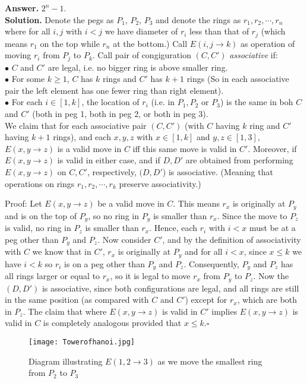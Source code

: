 \documentclass[11pt]{article}
\begin{document}
\begin{enumerate}
\textbf {Answer.} $2^n-1$.\\
\textbf{Solution.} Denote the pegs as $P_1$, $P_2$, $P_3$ and denote the rings as $r_1, r_2, \cdots ,r_n$ where for all $i, j$ with $i<j$ we have diameter of $r_i$ less than that of $r_j$ (which means $r_1$ on the top while $r_n$ at the bottom.) Call $E(i, j\to k)$ as operation of moving $r_i$ from $P_j$ to $P_k$. Call pair of congiguration $(C, C')$ \emph{associative} if:\\
$\bullet$ $C$ and $C'$ are legal, i.e. no bigger ring is above smaller ring.\\
$\bullet$ For some $k\ge 1$, $C$ has $k$ rings and $C'$ has $k+1$ rings (So in each associative pair the left element has one fewer ring than right element).\\
$\bullet$ For each $i\in [1,k]$, the location of $r_i$ (i.e. in $P_1, P_2$ or $P_3$) is the same in boh $C$ and $C'$ (both in peg 1, both in peg 2, or both in peg 3).\\
We claim that for each associative pair $(C,C')$ (with $C$ having $k$ ring and $C'$ having $k+1$ rings), and each $x, y, z$ with $x\in [1,k]$ and $y, z\in [1,3]$, $E(x, y\to z)$ is a valid move in $C$ iff this same move is valid in $C'$. Moreover, if $E(x, y\to z)$ is valid in either case, and if $D, D'$ are obtained from performing $E(x, y\to z)$ on $C, C'$, respectively, $(D, D'$) is associative. (Meaning that operations on rings $r_1, r_2, \cdots ,r_k$ preserve associativity.)

Proof: Let $E(x,y\to z)$ be a valid move in $C$. This means $r_x$ is originally at $P_y$ and is on the top of $P_y$, so no ring in $P_y$ is smaller than $r_x$. Since the move to $P_z$ is valid, no ring in $P_z$ is smaller than $r_x$. Hence, each $r_i$ with $i<x$ must be at a peg other than $P_y$ and $P_z$. Now consider $C'$, and by the definition of associativity with $C$ we know that in $C'$, $r_x$ is originally at $P_y$ and for all $i< x$, since $x\le k$ we have $i< k$ so $r_i$ is on a peg other than $P_y$ and $P_z$. Consequently, $P_y$ and $P_z$ has all rings larger or equal to $r_x$, so it is legal to move $r_x$ from $P_y$ to $P_z$. Now the $(D, D')$ is associative, since both configurations are legal, and all rings are still in the same position (as compared with $C$ and $C'$) except for $r_x$, which are both in $P_z$. The claim that where $E(x, y\to z)$ is valid in $C'$ implies $E(x, y\to z)$ is valid in $C$ is completely analogous provided that $x\le k$.$\square$


\graphicspath{ {E:/UW Fall 2016/ }}
\begin{figure}[h]
\texttt{[image: Towerofhanoi.jpg]}
\centering
\caption{Diagram illustrating $E(1, 2\to 3)$ as we move the smallest ring from $P_2$ to $P_3$}
\end{figure}


\end{enumerate}
\end{document}
